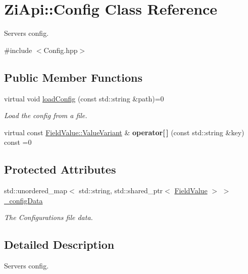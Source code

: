 \hypertarget{classZiApi_1_1Config}{}\section{Zi\+Api\+::Config Class Reference}
\label{classZiApi_1_1Config}


Server\textquotesingle{}s config.  




{\ttfamily \#include $<$Config.\+hpp$>$}

\subsection*{Public Member Functions}
\begin{DoxyCompactItemize}
\item 
virtual void \mbox{\hyperlink{classZiApi_1_1Config_adea7c918bc9802e935a76bc525d5c898}{load\+Config}} (const std\+::string \&path)=0
\begin{DoxyCompactList}\small\item\em Load the config from a file. \end{DoxyCompactList}\item 
\mbox{\label{classZiApi_1_1Config_a35e95b2fbf4adc334eb0b9df0966eda6}} 
virtual const \mbox{\hyperlink{classZiApi_1_1FieldValue_aa05c96baba965d0ad1cd54c7878f4450}{Field\+Value\+::\+Value\+Variant}} \& {\bfseries operator\mbox{[}$\,$\mbox{]}} (const std\+::string \&key) const =0
\end{DoxyCompactItemize}
\subsection*{Protected Attributes}
\begin{DoxyCompactItemize}
\item 
std\+::unordered\+\_\+map$<$ std\+::string, std\+::shared\+\_\+ptr$<$ \mbox{\hyperlink{classZiApi_1_1FieldValue}{Field\+Value}} $>$ $>$ \mbox{\hyperlink{classZiApi_1_1Config_a8f6f6b90cf9a3f5952b707a6f0da17a8}{\+\_\+config\+Data}}
\begin{DoxyCompactList}\small\item\em The Configuration\textquotesingle{}s file data. \end{DoxyCompactList}\end{DoxyCompactItemize}


\subsection{Detailed Description}
Server\textquotesingle{}s config. 

